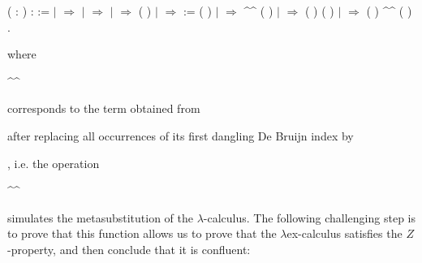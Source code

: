 \documentclass[conference]{IEEEtran}
\begin{document}
\begin{coqdoccode}
\coqdocemptyline
\coqdocnoindent
{}  ( : ) :  :=\coqdoceol
\coqdocindent{1.00em}
  \coqdoceol
\coqdocindent{1.00em}
\ensuremath{|}      \ensuremath{\Rightarrow} \coqdoceol
\coqdocindent{1.00em}
\ensuremath{|}      \ensuremath{\Rightarrow} \coqdoceol
\coqdocindent{1.00em}
\ensuremath{|}      \ensuremath{\Rightarrow}  ( )\coqdoceol
\coqdocindent{1.00em}
\ensuremath{|}    \ensuremath{\Rightarrow}   := ( ) \coqdoceol
\coqdocindent{11.00em}
  \coqdoceol
\coqdocindent{11.00em}
\ensuremath{|}   \ensuremath{\Rightarrow}  \^{}\^{} ( )\coqdoceol
\coqdocindent{11.00em}
\ensuremath{|} \coqdocvar{\_} \ensuremath{\Rightarrow}  ( ) ( )\coqdoceol
\coqdocindent{11.00em}
 \coqdoceol
\coqdocindent{1.00em}
\ensuremath{|}    \ensuremath{\Rightarrow} ( ) \^{}\^{} ( )\coqdoceol
\coqdocindent{1.00em}
.\coqdoceol
\end{coqdoccode}

\noindent where \begin{coqdoccode} \^{}\^{} \end{coqdoccode} corresponds to the term obtained from  \begin{coqdoccode}\end{coqdoccode} after replacing all occurrences of its first dangling De Bruijn index by  \begin{coqdoccode}\end{coqdoccode}, i.e. the operation  \begin{coqdoccode}\^{}\^{}\end{coqdoccode} simulates the metasubstitution of the $\lambda$-calculus. The following challenging step is to prove that this function allows us to prove that the  $\lambda$ex-calculus satisfies the $Z$-property, and then conclude that it is confluent:
\end{document}
